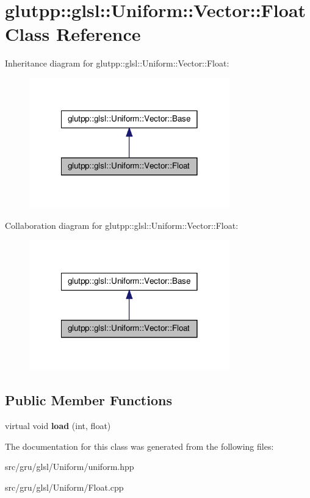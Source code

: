 \hypertarget{classglutpp_1_1glsl_1_1Uniform_1_1Vector_1_1Float}{\section{glutpp\-:\-:glsl\-:\-:\-Uniform\-:\-:\-Vector\-:\-:\-Float \-Class \-Reference}
\label{classglutpp_1_1glsl_1_1Uniform_1_1Vector_1_1Float}
}


\-Inheritance diagram for glutpp\-:\-:glsl\-:\-:\-Uniform\-:\-:\-Vector\-:\-:\-Float\-:
\nopagebreak
\begin{figure}[H]
\begin{center}
\leavevmode
\includegraphics[width=246pt]{classglutpp_1_1glsl_1_1Uniform_1_1Vector_1_1Float__inherit__graph}
\end{center}
\end{figure}


\-Collaboration diagram for glutpp\-:\-:glsl\-:\-:\-Uniform\-:\-:\-Vector\-:\-:\-Float\-:
\nopagebreak
\begin{figure}[H]
\begin{center}
\leavevmode
\includegraphics[width=246pt]{classglutpp_1_1glsl_1_1Uniform_1_1Vector_1_1Float__coll__graph}
\end{center}
\end{figure}
\subsection*{\-Public \-Member \-Functions}
\begin{DoxyCompactItemize}
\item 
\hypertarget{classglutpp_1_1glsl_1_1Uniform_1_1Vector_1_1Float_a76a64c4d0b3237bb2195048f88cb660d}{virtual void {\bfseries load} (int, float)}\label{classglutpp_1_1glsl_1_1Uniform_1_1Vector_1_1Float_a76a64c4d0b3237bb2195048f88cb660d}

\end{DoxyCompactItemize}


\-The documentation for this class was generated from the following files\-:\begin{DoxyCompactItemize}
\item 
src/gru/glsl/\-Uniform/uniform.\-hpp\item 
src/gru/glsl/\-Uniform/\-Float.\-cpp\end{DoxyCompactItemize}

